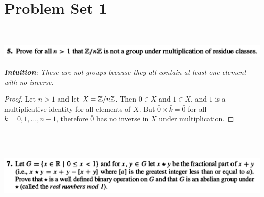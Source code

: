 \section*{Problem  Set 1}

~\\
\begin{mdframed}
\includegraphics[width=400pt]{img/algebra--nf--1--problem-set-1-a4bb.png}
\end{mdframed}

{\it {\bf Intuition}: These are not groups because they all contain at least one element with no inverse.}

\begin{proof}
  Let $n > 1$ and let $X = \mathbb{Z}/n\mathbb{Z}$. Then $\bar{0} \in X$ and $\bar{1} \in X$, and $\bar{1}$ is a
  multiplicative identity for all elements of $X$. But $\bar{0} \times \bar{k} = \bar{0}$ for
  all $k = 0, 1, \ldots, n - 1$, therefore $\bar{0}$ has no inverse in $X$ under multiplication.
\end{proof}

~\\~\\
\begin{mdframed}
\includegraphics[width=400pt]{img/algebra--nf--1--problem-set-1-c770.png}
\end{mdframed}

